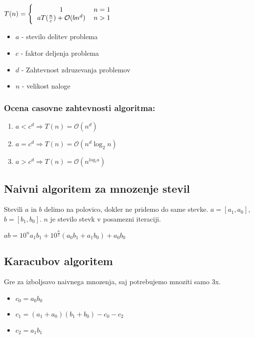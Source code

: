 \documentclass{article}
\begin{document}
\begin{multicols}{4}
\begin{center}
    \begin{math}
        T(n) =
        \Bigg \{\begin{tabular}{ccc}
          $1$  & $n = 1$ & \\
          $a T(\frac{n}{c}) + \mathcal{O}(bn^d)$ & $n > 1$ & \\
        \end{tabular}
    \end{math} 
\end{center}

\begin{itemize}
    \item $a$ - stevilo delitev problema
    \item $c$ - faktor deljenja problema
    \item $d$ - Zahtevnost zdruzevanja problemov 
    \item $n$ - velikost naloge
\end{itemize}

\subsubsection{Ocena casovne zahtevnosti algoritma:}
\begin{enumerate}
    \item $a < c^d \Rightarrow T(n) = \mathcal{O}(n^d)$
    \item $a = c^d \Rightarrow T(n) = \mathcal{O}(n^d \log_2 n)$
    \item $a > c^d \Rightarrow T(n) = \mathcal{O}(n^{log_c a})$
\end{enumerate}

\subsection{Naivni algoritem za mnozenje stevil}
Stevili $a$ in $b$ delimo na polovico, dokler ne pridemo do same stevke.
$a = [a_1, a_0]$, $b =[b_1, b_0]$. $n$ je stevilo stevk v posamezni iteraciji.

\begin{center}
    \begin{math}
        ab = 10^n a_1 b_1 + 10^{\frac{n}{2}}(a_0 b_1 + a_1 b_0) + a_0 b_0
    \end{math}
\end{center}

\subsection{Karacubov algoritem}
Gre za izboljsavo naivnega mnozenja, saj potrebujemo mnoziti samo 3x.
\begin{itemize}
    \item $c_0 = a_0 b_0$
    \item $c_1 = (a_1 + a_0) (b_1 + b_0) - c_0 - c_2$
    \item $c_2 = a_1 b_1$
\end{itemize}



\end{multicols}
\end{document}
